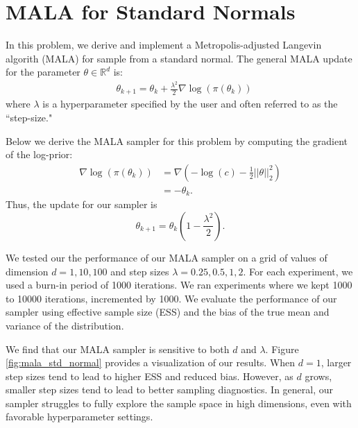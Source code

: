 \documentclass{article}
\begin{document}
\section{MALA for Standard Normals}

In this problem, we derive and implement a Metropolis-adjusted Langevin algorith (MALA) for sample from a standard normal.
The general MALA update for the parameter $\theta \in\mathbb{R}^{d}$ is:
\begin{align}
    & \theta_{k+1} = \theta_{k} + \frac{\lambda^{2}}{2} \nabla \log(\pi(\theta_{k}))
\end{align}
where $\lambda$ is a hyperparameter specified by the user and often referred to as the ``step-size."

Below we derive the MALA sampler for this problem by computing the gradient of the log-prior:
\begin{align}
	\nabla \log(\pi(\theta_{k})) & = \nabla \left(-\log(c) - \frac{1}{2} ||\theta||_2^2 \right) \\
	& = -\theta_{k}.
\end{align}
Thus, the update for our sampler is $$\theta_{k+1} = \theta_{k} \left(1 - \frac{\lambda^{2}}{2}\right).$$

We tested our the performance of our MALA sampler on a grid of values of dimension $d = 1, 10, 100$ and step sizes $\lambda = 0.25, 0.5, 1, 2$.
For each experiment, we used a burn-in period of 1000 iterations.
We ran experiments where we kept 1000 to 10000 iterations, incremented by 1000.
We evaluate the performance of our sampler using effective sample size (ESS) and the bias of the true mean and variance of the distribution.

We find that our MALA sampler is sensitive to both $d$ and $\lambda$.
Figure \ref{fig:mala_std_normal} provides a visualization of our results.
When $d = 1$, larger step sizes tend to lead to higher ESS and reduced bias.
However, as $d$ grows, smaller step sizes tend to lead to better sampling diagnostics.
In general, our sampler struggles to fully explore the sample space in high dimensions, even with favorable hyperparameter settings.
\end{document}

